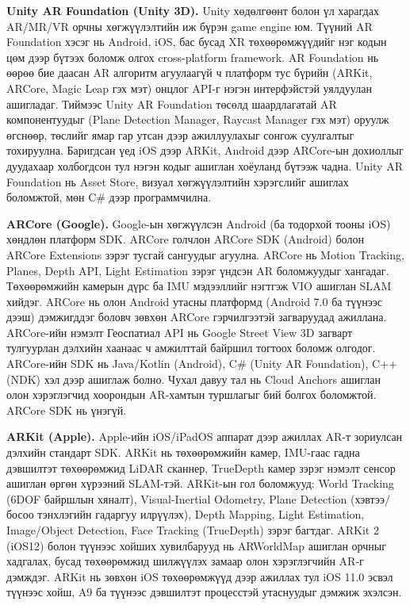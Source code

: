 \begin{sloppy}
\textbf{Unity AR Foundation (Unity 3D).} Unity хөдөлгөөнт болон үл харагдах AR/MR/VR орчны хөгжүүлэлтийн иж бүрэн game engine юм. Түүний AR Foundation хэсэг нь Android, iOS, бас бусад XR төхөөрөмжүүдийг нэг кодын цөм дээр бүтээх боломж олгох cross-platform framework. AR Foundation нь өөрөө бие даасан AR алгоритм агуулаагүй ч платформ тус бүрийн (ARKit, ARCore, Magic Leap гэх мэт) онцлог API-г нэгэн интерфэйстэй уялдуулан ашигладаг. Тиймээс Unity AR Foundation төсөлд шаардлагатай AR компонентуудыг (Plane Detection Manager, Raycast Manager гэх мэт) оруулж өгснөөр, төслийг ямар гар утсан дээр ажиллуулахыг сонгож суулгалтыг тохируулна. Баригдсан үед iOS дээр ARKit, Android дээр ARCore-ын дохиоллыг дуудахаар холбогдсон тул нэгэн кодыг ашиглан хоёуланд бүтээж чадна. Unity AR Foundation нь Asset Store, визуал хөгжүүлэлтийн хэрэгслийг ашиглах боломжтой, мөн C\# дээр программчилна.

\textbf{ARCore (Google).} Google-ын хөгжүүлсэн Android (ба тодорхой тооны iOS) хөндлөн платформ SDK. ARCore голчлон ARCore SDK (Android) болон ARCore Extensions зэрэг тусгай сангуудыг агуулна. ARCore нь Motion Tracking, Planes, Depth API, Light Estimation зэрэг үндсэн AR боломжуудыг хангадаг. Төхөөрөмжийн камерын дүрс ба IMU мэдээллийг нэгтгэж VIO ашиглан SLAM хийдэг. ARCore нь олон Android утасны платформд (Android 7.0 ба түүнээс дээш) дэмжигддэг боловч зөвхөн ARCore гэрчилгээтэй загваруудад ажиллана. ARCore-ийн нэмэлт Геоспатиал API нь Google Street View 3D загварт тулгуурлан дэлхийн хаанаас ч амжилттай байршил тогтоох боломж олгодог. ARCore-ийн SDK нь Java/Kotlin (Android), C\# (Unity AR Foundation), C++ (NDK) хэл дээр ашиглаж болно. Чухал давуу тал нь Cloud Anchors ашиглан олон хэрэглэгчид хоорондын AR-хамтын туршлагыг бий болгох боломжтой. ARCore SDK нь үнэгүй.

\textbf{ARKit (Apple).} Apple-ийн iOS/iPadOS аппарат дээр ажиллах AR-т зориулсан дэлхийн стандарт SDK. ARKit нь төхөөрөмжийн камер, IMU-гаас гадна дэвшилтэт төхөөрөмжид LiDAR сканнер, TrueDepth камер зэрэг нэмэлт сенсор ашиглан өргөн хүрээний SLAM-тэй. ARKit-ын гол боломжууд: World Tracking (6DOF байршлын хяналт), Visual-Inertial Odometry, Plane Detection (хэвтээ/босоо тэнхлэгийн гадаргуу илрүүлэх), Depth Mapping, Light Estimation, Image/Object Detection, Face Tracking (TrueDepth) зэрэг багтдаг. ARKit 2 (iOS12) болон түүнээс хойших хувилбарууд нь ARWorldMap ашиглан орчныг хадгалах, бусад төхөөрөмжид шилжүүлэх замаар олон хэрэглэгчийн AR-г дэмждэг. ARKit нь зөвхөн iOS төхөөрөмжүүд дээр ажиллах тул iOS 11.0 эсвэл түүнээс хойш, A9 ба түүнээс дэвшилтэт процесстэй утаснуудыг дэмжиж эхэлсэн.


\end{sloppy}

